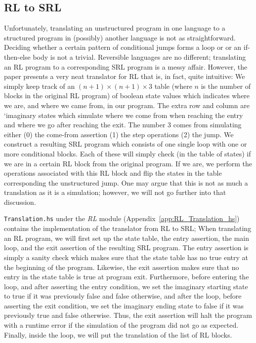 \subsection{RL to SRL}

Unfortunately, translating an unstructured program in one language to a structured program in (possibly) another language is not as straightforward. Deciding whether a certain pattern of conditional jumps forms a loop or or an if-then-else body is not a trivial. Reversible languages are no different; translating an RL program to a corresponding SRL program is a messy affair. However, the paper \cite[Fig.~22]{REV} presents a very neat translator for RL that is, in fact, quite intuitive: We simply keep track of an $(n+1) \times (n+1) \times 3$ table (where $n$ is the number of blocks in the original RL program) of boolean state values which indicates where we are, and where we came from, in our program. The extra row and column are `imaginary states which simulate where we come from when reaching the entry and where we go after reaching the exit. The number $3$ comes from simulating either (0) the come-from assertion (1) the step operations (2) the jump. We construct a resulting SRL program which consists of one single loop with one or more conditional blocks. Each of these will simply check (in the table of states) if we are in a certain RL block from the original program. If we are, we perform the operations associated with this RL block and flip the states in the table corresponding the unstructured jump. One may argue that this is not as much a translation as it is a simulation; however, we will not go further into that discussion.

\texttt{Translation.hs} under the \textit{RL} module (Appendix~\ref{app:RL_Translation_hs}) contains the implementation of the translator from RL to SRL; When translating an RL program, we will first set up the state table, the entry assertion, the main loop, and the exit assertion of the resulting SRL program. The entry assertion is simply a sanity check which makes sure that the state table has no true entry at the beginning of the program. Likewise, the exit assertion makes sure that no entry in the state table is true at program exit. Furthermore, before entering the loop, and after asserting the entry condition, we set the imaginary starting state to true if it was previously false and false otherwise, and after the loop, before asserting the exit condition, we set the imaginary ending state to false if it was previously true and false otherwise. Thus, the exit assertion will halt the program with a runtime error if the simulation of the program did not go as expected. Finally, inside the loop, we will put the translation of the list of RL blocks.

